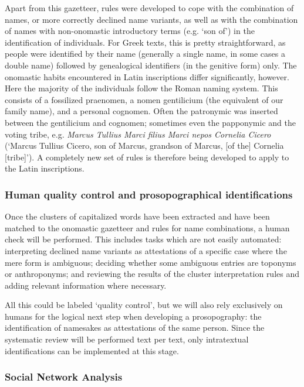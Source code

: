 \documentclass[amsthm,ebook]{saparticle}
\begin{document}
Apart from this gazetteer, rules were developed to cope with the combination of names, or more correctly declined name
variants, as well as with the combination of names with non-onomastic introductory terms (e.g. `son of') in the
identification of individuals. For Greek texts, this is pretty straightforward, as people were identified by their name
(generally a single name, in some cases a double name) followed by genealogical identifiers (in the genitive form)
only. The onomastic habits encountered in Latin inscriptions differ significantly, however. Here the majority of the
individuals follow the Roman naming system. This consists of a fossilized praenomen, a nomen gentilicium (the
equivalent of our family name), and a personal cognomen. Often the patronymic was inserted between the gentilicium and
cognomen; sometimes even the papponymic and the voting tribe, e.g. \emph{Marcus Tullius Marci filius Marci nepos Cornelia
Cicero} (`Marcus Tullius Cicero, son of Marcus, grandson of Marcus, [of the] Cornelia [tribe]'). A completely new set of
rules is therefore being developed to apply to the Latin inscriptions.




\subsubsection{Human quality control and prosopographical identifications}


\noindent Once the clusters of capitalized words have been extracted and have been matched to the onomastic gazetteer and rules
for name combinations, a human check will be performed. This includes tasks which are not easily automated:
interpreting declined name variants as attestations of a specific case where the mere form is ambiguous; deciding
whether some ambiguous entries are toponyms or anthroponyms; and reviewing the results of the cluster interpretation
rules and adding relevant information where necessary. 

All this could be labeled `quality control', but we will also rely exclusively on humans for the logical next step when
developing a prosopography: the identification of namesakes as attestations of the same person. Since the systematic
review will be performed text per text, only intratextual identifications can be implemented at this stage.




\subsubsection{Social Network Analysis}
\end{document}
